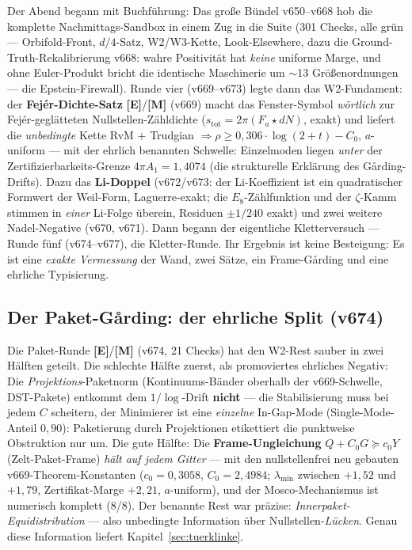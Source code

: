 \documentclass[11pt,a4paper]{article}
\newcommand{\E}{\textcolor{gut}{\textbf{[E]}}}
\newcommand{\M}{\textcolor{mess}{\textbf{[M]}}}
\begin{document}
Der Abend begann mit Buchführung: Das große Bündel v650--v668 hob
die komplette Nachmittags-Sandbox in einem Zug in die Suite (301
Checks, alle grün --- Orbifold-Front, $d/4$-Satz, W2/W3-Kette,
Look-Elsewhere, dazu die Ground-Truth-Rekalibrierung v668: wahre
Positivität hat \emph{keine} uniforme Marge, und ohne Euler-Produkt
bricht die identische Maschinerie um $\sim$13 Größenordnungen ---
die Epstein-Firewall). Runde vier (v669--v673) legte dann das
W2-Fundament: der \textbf{Fejér-Dichte-Satz} \E{}/\M{} (v669) macht
das Fenster-Symbol \emph{wörtlich} zur Fejér-geglätteten
Nullstellen-Zähldichte ($s_{\mathrm{tot}} = 2\pi(F_a \star dN)$,
exakt) und liefert die \emph{unbedingte} Kette RvM $+$ Trudgian
$\Rightarrow \rho \ge 0{,}306 \cdot \log(2+t) - C_0$, $a$-uniform
--- mit der ehrlich benannten Schwelle: Einzelmoden liegen
\emph{unter} der Zertifizierbarkeits-Grenze $4\pi A_1 = 1{,}4074$
(die strukturelle Erklärung des Gårding-Drifts). Dazu das
\textbf{Li-Doppel} (v672/v673: der Li-Koeffizient ist ein
quadratischer Formwert der Weil-Form, Laguerre-exakt; die
$E_8$-Zählfunktion und der $\zeta$-Kamm stimmen in \emph{einer}
Li-Folge überein, Residuen $\pm 1/240$ exakt) und zwei weitere
Nadel-Negative (v670, v671). Dann begann der eigentliche
Kletterversuch --- Runde fünf (v674--v677), die
\glqq{}Kletter-Runde\grqq{}. Ihr Ergebnis ist keine Besteigung: Es
ist eine \emph{exakte Vermessung} der Wand, zwei Sätze, ein
Frame-Gårding und eine ehrliche Typisierung.

\subsection*{Der Paket-Gårding: der ehrliche Split (v674)}

Die Paket-Runde \E{}/\M{} (v674, 21 Checks) hat den W2-Rest sauber
in zwei Hälften geteilt. Die schlechte Hälfte zuerst, als
promoviertes ehrliches Negativ: Die \emph{Projektions}-Paketnorm
(Kontinuums-Bänder oberhalb der v669-Schwelle, DST-Pakete) entkommt
dem $1/\log$-Drift \textbf{nicht} --- die Stabilisierung muss bei
jedem $C$ scheitern, der Minimierer ist eine \emph{einzelne}
In-Gap-Mode (Single-Mode-Anteil $0{,}90$): Paketierung durch
Projektionen etikettiert die punktweise Obstruktion nur um. Die
gute Hälfte: Die \textbf{Frame-Ungleichung} $Q + C_0 G \succeq c_0
Y$ (Zelt-Paket-Frame) \emph{hält auf jedem Gitter} --- mit den
nullstellenfrei neu gebauten v669-Theorem-Konstanten ($c_0 =
0{,}3058$, $C_0 = 2{,}4984$; $\lambda_{\min}$ zwischen $+1{,}52$
und $+1{,}79$, Zertifikat-Marge $+2{,}21$, $a$-uniform), und der
Mosco-Mechanismus ist numerisch komplett (8/8). Der benannte Rest
war präzise: \emph{Innerpaket-Equidistribution} --- also unbedingte
Information über Nullstellen-\emph{Lücken}. Genau diese Information
liefert Kapitel~\ref{sec:tuerklinke}.
\end{document}
